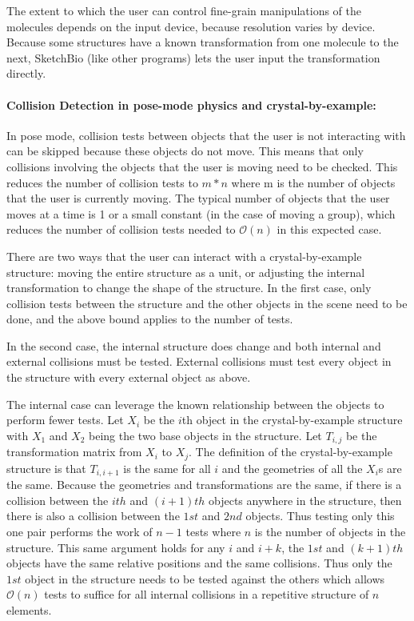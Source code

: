 \documentclass[twocolumn]{bmcart}%
\begin{document}
The extent to which the user can control fine-grain manipulations of the molecules depends on the input device, because resolution varies by device. Because some structures have a known transformation from one molecule to the next, SketchBio (like other programs) lets the user input the transformation directly.

\paragraph*{Collision Detection in pose-mode physics and crystal-by-example:}
In pose mode, collision tests between objects that the user is not interacting with can be skipped because these objects do not move.
This means that only collisions involving the objects that the user is moving need to be checked.
This reduces the number of collision tests to $m*n$ where m is the number of objects that the user is currently moving.
The typical number of objects that the user moves at a time is 1 or a small constant (in the case of moving a group), which reduces the number of collision tests needed to $\mathcal{O}(n)$ in this expected case.

There are two ways that the user can interact with a crystal-by-example structure: moving the entire structure as a unit, or adjusting the internal transformation to change the shape of the structure.
In the first case, only collision tests between the structure and the other objects in the scene need to be done, and the above bound applies to the number of tests.

In the second case, the internal structure does change and both internal and external collisions must be tested.
External collisions must test every object in the structure with every external object as above.

The internal case can leverage the known relationship between the objects to perform fewer tests.  Let $X_i$ be the $i$th object in the crystal-by-example structure with $X_1$ and $X_2$ being the two base objects in the structure.
Let $T_{i,j}$ be the transformation matrix from $X_i$ to $X_j$.
The definition of the crystal-by-example structure is that $T_{i,i+1}$ is the same for all $i$ and the geometries of all the $X_i$s are the same.
Because the geometries and transformations are the same, if there is a collision between the $ith$ and $(i+1)th$ objects anywhere in the structure, then there is also a collision between the $1st$ and $2nd$ objects.
Thus testing only this one pair performs the work of $n-1$ tests where $n$ is the number of objects in the structure.
This same argument holds for any $i$ and $i+k$, the $1st$ and $(k+1)th$ objects have the same relative positions and the same collisions.
Thus only the $1st$ object in the structure needs to be tested against the others which allows $\mathcal{O}(n)$ tests to suffice for all internal collisions in a repetitive structure of $n$ elements.
\end{document}
